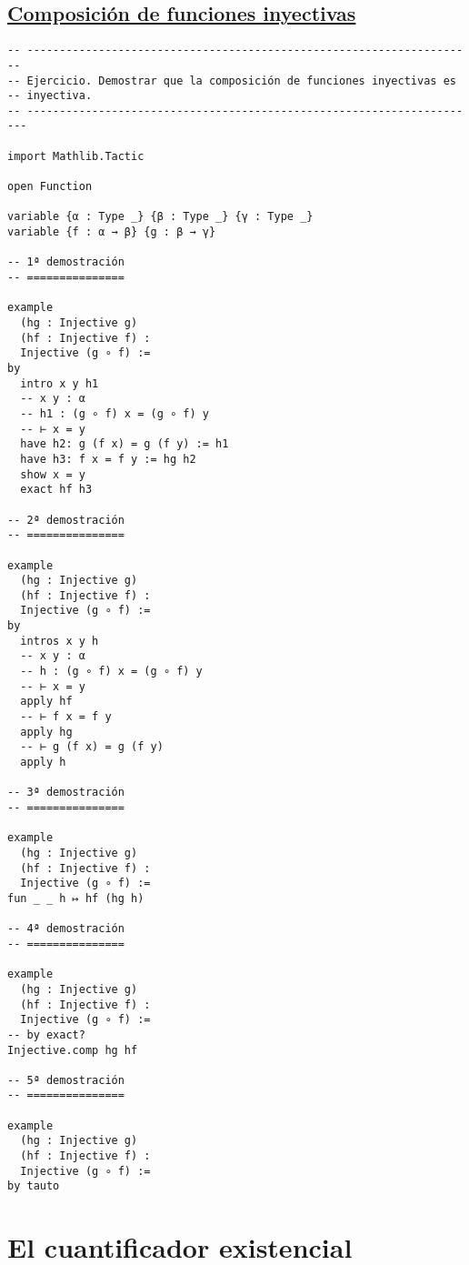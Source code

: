 \subsection{\href{./src/Logica/Composicion\_de\_funciones\_inyectivas.lean}{Composición de funciones inyectivas}}
\label{sec:org705f2fe}
\begin{verbatim}
-- ---------------------------------------------------------------------
-- Ejercicio. Demostrar que la composición de funciones inyectivas es
-- inyectiva.
-- ----------------------------------------------------------------------

import Mathlib.Tactic

open Function

variable {α : Type _} {β : Type _} {γ : Type _}
variable {f : α → β} {g : β → γ}

-- 1ª demostración
-- ===============

example
  (hg : Injective g)
  (hf : Injective f) :
  Injective (g ∘ f) :=
by
  intro x y h1
  -- x y : α
  -- h1 : (g ∘ f) x = (g ∘ f) y
  -- ⊢ x = y
  have h2: g (f x) = g (f y) := h1
  have h3: f x = f y := hg h2
  show x = y
  exact hf h3

-- 2ª demostración
-- ===============

example
  (hg : Injective g)
  (hf : Injective f) :
  Injective (g ∘ f) :=
by
  intros x y h
  -- x y : α
  -- h : (g ∘ f) x = (g ∘ f) y
  -- ⊢ x = y
  apply hf
  -- ⊢ f x = f y
  apply hg
  -- ⊢ g (f x) = g (f y)
  apply h

-- 3ª demostración
-- ===============

example
  (hg : Injective g)
  (hf : Injective f) :
  Injective (g ∘ f) :=
fun _ _ h ↦ hf (hg h)

-- 4ª demostración
-- ===============

example
  (hg : Injective g)
  (hf : Injective f) :
  Injective (g ∘ f) :=
-- by exact?
Injective.comp hg hf

-- 5ª demostración
-- ===============

example
  (hg : Injective g)
  (hf : Injective f) :
  Injective (g ∘ f) :=
by tauto
\end{verbatim}

\section{El cuantificador existencial}
\label{sec:org0bc415c}

